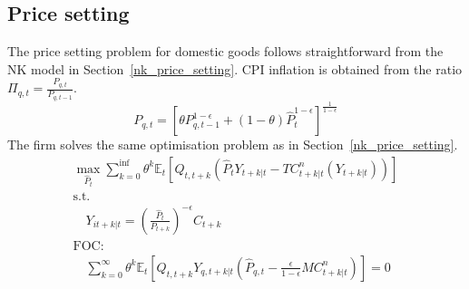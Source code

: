 \documentclass[12pt,a4paper,english]{article} %
\newcommand{\E}{\mathbb{E}} %
\begin{document}
	\subsection{Price setting}
	The price setting problem for domestic goods follows straightforward from the NK model in Section~\ref{nk_price_setting}. \ac{CPI} inflation is obtained from the ratio $\Pi_{q,t} = \frac{P_{q,t}}{P_{q,t-1}}$.
	\begin{equation}
		P_{q,t} = 
		\left[ 
		\theta P_{q,t-1}^{1 - \epsilon} + (1 - \theta) \hat{P}_t^{1 - \epsilon}
		\right]^{\frac{1}{1 - \epsilon}}
	\end{equation}
	The firm solves the same optimisation problem as in Section~\ref{nk_price_setting}. 
	\begin{equation}
		\begin{aligned}
			\max_{\hat{P}_t}
			\sum_{k=0}^{\inf} \theta^k \E_t 
			\left[
			Q_{t, t+k} 
			\left(
			\hat{P}_t Y_{t+k|t} - TC_{t+k|t}^n(Y_{t+k|t})
			\right)
			\right] \\
			\textrm{s.t.}\\
			\quad
			Y_{it+k|t} = \left(\frac{\hat{P}_t}{P_{t+k}} \right)^{-\epsilon} C_{t+k} \\
			\textrm{FOC:} \\ 
			\quad
			\sum_{k=0}^{\infty} \theta^k \E_t 
			\left[
			Q_{t,t+k} Y_{q,t+k|t} 
			\left(
			\hat{P}_{q,t} - \frac{\epsilon}{1 - \epsilon} MC_{t+k|t}^n
			\right)
			\right]
			= 0
		\end{aligned}
	\end{equation}
\end{document}
